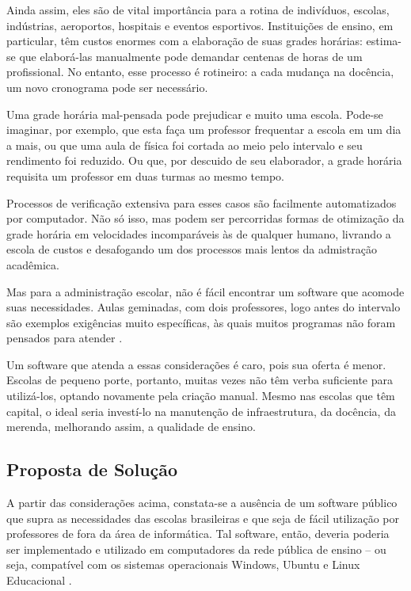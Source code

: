 \documentclass[12pt,a4paper]{article}
\begin{document}
			\par Ainda assim, eles são de vital importância para a rotina de indivíduos, escolas, indústrias, aeroportos, hospitais e eventos esportivos. Instituições de ensino, em particular, têm custos enormes com a elaboração de suas grades horárias: estima-se que elaborá-las manualmente pode demandar centenas de horas \cite{appleby} de um profissional. No entanto, esse processo é rotineiro: a cada mudança na docência, um novo cronograma pode ser necessário.

			\par Uma grade horária mal-pensada pode prejudicar e muito uma escola. Pode-se imaginar, por exemplo, que esta faça um professor frequentar a escola em um dia a mais, ou que uma aula de física foi cortada ao meio pelo intervalo e seu rendimento foi reduzido. Ou que, por descuido de seu elaborador, a grade horária requisita um professor em duas turmas ao mesmo tempo.

			\par Processos de verificação extensiva para esses casos são facilmente automatizados por computador. Não só isso, mas podem ser percorridas formas de otimização da grade horária em velocidades incomparáveis às de qualquer humano, livrando a escola de custos e desafogando um dos processos mais lentos da admistração acadêmica.

			\par Mas para a administração escolar, não é fácil encontrar um software que acomode suas necessidades. Aulas geminadas, com dois professores, logo antes do intervalo são exemplos exigências muito específicas, às quais muitos programas não foram pensados para atender \cite{nikita}.

			\par Um software que atenda a essas considerações é caro, pois sua oferta é menor. Escolas de pequeno porte, portanto, muitas vezes não têm verba suficiente para utilizá-los, optando novamente pela criação manual. Mesmo nas escolas que têm capital, o ideal seria investí-lo na manutenção de infraestrutura, da docência, da merenda, melhorando assim, a qualidade de ensino.

		\subsection{Proposta de Solução}

			 \par A partir das considerações acima, constata-se a ausência de um software público \cite{publico} que supra as necessidades das escolas brasileiras e que seja de fácil utilização por professores de fora da área de informática. Tal software, então, deveria poderia ser implementado e utilizado em computadores da rede pública de ensino -- ou seja, compatível com os sistemas operacionais Windows, Ubuntu e Linux Educacional \cite{proinfo}.
\end{document}
